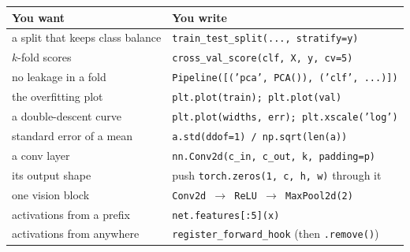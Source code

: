 \documentclass[11pt]{article}
\begin{document}
\begin{center}
\begin{tabular}{@{}p{}p{}@{}}
\toprule
\textbf{You want} & \textbf{You write} \\
\midrule
a split that keeps class balance   & \texttt{train\_test\_split(..., stratify=y)} \\
$k$-fold scores                    & \texttt{cross\_val\_score(clf, X, y, cv=5)} \\
no leakage in a fold               & \texttt{Pipeline([('pca', PCA()), ('clf', ...)])} \\
the overfitting plot               & \texttt{plt.plot(train); plt.plot(val)} \\
a double-descent curve             & \texttt{plt.plot(widths, err); plt.xscale('log')} \\
standard error of a mean           & \texttt{a.std(ddof=1) / np.sqrt(len(a))} \\
a conv layer                       & \texttt{nn.Conv2d(c\_in, c\_out, k, padding=p)} \\
its output shape                   & push \texttt{torch.zeros(1, c, h, w)} through it \\
one vision block                   & \texttt{Conv2d $\to$ ReLU $\to$ MaxPool2d(2)} \\
activations from a prefix          & \texttt{net.features[:5](x)} \\
activations from anywhere          & \texttt{register\_forward\_hook} (then \texttt{.remove()}) \\
\bottomrule
\end{tabular}
\end{center}
\end{document}
